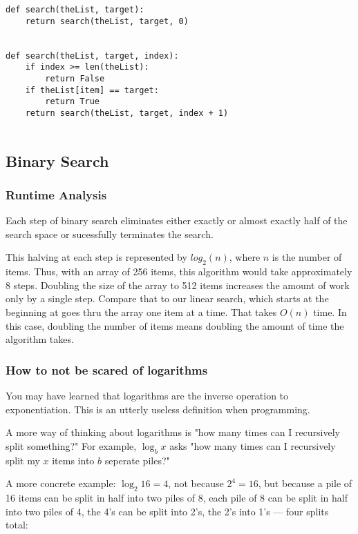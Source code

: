 \begin{verbatim}
def search(theList, target):
	return search(theList, target, 0)


def search(theList, target, index):
	if index >= len(theList):
		return False 
	if theList[item] == target:
		return True
	return search(theList, target, index + 1)
	
\end{verbatim}


\subsection{Binary Search}






\subsubsection{Runtime Analysis}
Each step of binary search eliminates either exactly or almost exactly half of the search space or sucessfully terminates the search.

This halving at each step is represented by $log_2(n)$, where $n$ is the number of items.  Thus, with an array of 256 items, this algorithm would take approximately 8 steps. Doubling the size of the array to 512 items increases the amount of work only by a single step.   Compare that to our linear search, which starts at the beginning at goes thru the array one item at a time.  That takes $O(n)$ time.  In this case, doubling the number of items means doubling the amount of time the algorithm takes.





\subsubsection{How to not be scared of logarithms }
You may have learned that logarithms are the inverse operation to exponentiation.
This is an utterly useless definition when programming.


A more way of thinking about logarithms is "how many times can I recursively split something?"
For example, $\log_b x$ asks "how many times can I recursively split my $x$ items into $b$ seperate piles?"

A more concrete example: $\log_2 16 = 4$, not because $2^4 = 16$, but because a pile of 16 items can be split in half into two piles of 8, each pile of 8 can be split in half into two piles of 4, the 4's can be split into 2's, the 2's into 1's --- four splits total:

